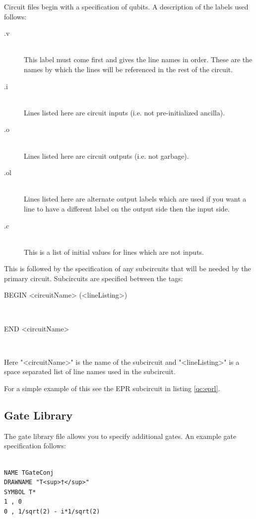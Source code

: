 \documentclass[10pt]{article}
\theoremstyle{definition}
\begin{document}
Circuit files begin with a specification of qubits. A description of the labels used follows:
\begin{description}
\item[.v] \hfill \\
This label must come first and gives the line names in order.  These are the names by which the lines
will be referenced in the rest of the circuit.
\item[.i] \hfill \\
Lines listed here are circuit inputs (i.e. not pre-initialized ancilla).
\item[.o] \hfill \\
Lines listed here are circuit outputs (i.e. not garbage).
\item[.ol] \hfill \\
Lines listed here are alternate output labels which are used if you want a 
line to have a different label on the output side then the input side.
\item[.c] \hfill \\
This is a list of initial values for lines which are not inputs.
\end{description}

This is followed by the specification of any subcircuits that will be needed by the primary circuit.
Subcircuits are specified between the tags:
\begin{description}
\item[BEGIN <circuitName> (<lineListing>)] \hfill \\
\item[END <circuitName>] \hfill \\
\end{description}
Here "<circuitName>" is the name of the subcircuit and "<lineListing>" is a space separated list of line names
used in the subcircuit. 



For a simple example of this see the EPR subcircuit in listing \ref{qc:eprl}.

\subsection{Gate Library}
The gate library file allows you to specify additional gates.  An example gate specification follows:

\small
\begin{verbatim}

NAME TGateConj
DRAWNAME "T<sup>†</sup>"
SYMBOL T*
1 , 0
0 , 1/sqrt(2) - i*1/sqrt(2)

\end{verbatim}
\normalsize
\end{document}
